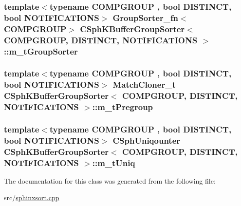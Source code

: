 \hypertarget{classCSphKBufferGroupSorter_a792befd75f67c1556546c640c8393e52}{
\subsubsection[{m\-\_\-t\-Group\-Sorter}]{\setlength{\rightskip}{0pt plus 5cm}template$<$typename C\-O\-M\-P\-G\-R\-O\-U\-P , bool D\-I\-S\-T\-I\-N\-C\-T, bool N\-O\-T\-I\-F\-I\-C\-A\-T\-I\-O\-N\-S$>$ {\bf Group\-Sorter\-\_\-fn}$<$C\-O\-M\-P\-G\-R\-O\-U\-P$>$ {\bf C\-Sph\-K\-Buffer\-Group\-Sorter}$<$ C\-O\-M\-P\-G\-R\-O\-U\-P, D\-I\-S\-T\-I\-N\-C\-T, N\-O\-T\-I\-F\-I\-C\-A\-T\-I\-O\-N\-S $>$\-::m\-\_\-t\-Group\-Sorter\hspace{0.3cm}{\ttfamily [protected]}}}\label{classCSphKBufferGroupSorter_a792befd75f67c1556546c640c8393e52}
\hypertarget{classCSphKBufferGroupSorter_a39a11343e6d54262d9f9c6816d8ce9b8}{
\subsubsection[{m\-\_\-t\-Pregroup}]{\setlength{\rightskip}{0pt plus 5cm}template$<$typename C\-O\-M\-P\-G\-R\-O\-U\-P , bool D\-I\-S\-T\-I\-N\-C\-T, bool N\-O\-T\-I\-F\-I\-C\-A\-T\-I\-O\-N\-S$>$ {\bf Match\-Cloner\-\_\-t} {\bf C\-Sph\-K\-Buffer\-Group\-Sorter}$<$ C\-O\-M\-P\-G\-R\-O\-U\-P, D\-I\-S\-T\-I\-N\-C\-T, N\-O\-T\-I\-F\-I\-C\-A\-T\-I\-O\-N\-S $>$\-::m\-\_\-t\-Pregroup\hspace{0.3cm}{\ttfamily [protected]}}}\label{classCSphKBufferGroupSorter_a39a11343e6d54262d9f9c6816d8ce9b8}
\hypertarget{classCSphKBufferGroupSorter_a576994607f66fb733836db0a8466f22d}{
\subsubsection[{m\-\_\-t\-Uniq}]{\setlength{\rightskip}{0pt plus 5cm}template$<$typename C\-O\-M\-P\-G\-R\-O\-U\-P , bool D\-I\-S\-T\-I\-N\-C\-T, bool N\-O\-T\-I\-F\-I\-C\-A\-T\-I\-O\-N\-S$>$ {\bf C\-Sph\-Uniqounter} {\bf C\-Sph\-K\-Buffer\-Group\-Sorter}$<$ C\-O\-M\-P\-G\-R\-O\-U\-P, D\-I\-S\-T\-I\-N\-C\-T, N\-O\-T\-I\-F\-I\-C\-A\-T\-I\-O\-N\-S $>$\-::m\-\_\-t\-Uniq\hspace{0.3cm}{\ttfamily [protected]}}}\label{classCSphKBufferGroupSorter_a576994607f66fb733836db0a8466f22d}


The documentation for this class was generated from the following file\-:\begin{DoxyCompactItemize}
\item 
src/\hyperlink{sphinxsort_8cpp}{sphinxsort.\-cpp}\end{DoxyCompactItemize}
